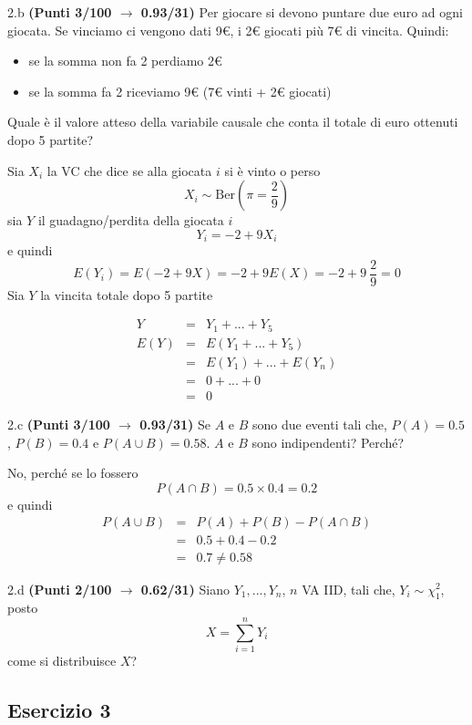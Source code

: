 \documentclass[
  11pt,
]{book}
\providecommand{\tightlist}{%
  \setlength{\itemsep}{0pt}\setlength{\parskip}{0pt}}
\theoremstyle{mytheoremstyle}
\theoremstyle{mydefstyle}
\newenvironment{sol}
  {
  \begin{tcolorbox}[enhanced,breakable,arc=0.1mm,boxrule=1pt,colback=white,colframe=iblue,
  title=\bf \fontfamily{lmss}\selectfont \hspace{.5 cm} Soluzione,drop fuzzy shadow]

}{
\end{tcolorbox}
  }
\begin{document}
2.b \textbf{(Punti 3/100 \(\rightarrow\) 0.93/31)} Per giocare si devono puntare due euro ad ogni giocata. Se vinciamo ci vengono dati 9€, i 2€ giocati più 7€ di vincita. Quindi:

\begin{itemize}
\tightlist
\item
  se la somma non fa 2 perdiamo 2€
\item
  se la somma fa 2 riceviamo 9€ (7€ vinti + 2€ giocati)
\end{itemize}

Quale è il valore atteso della variabile causale che conta il totale di euro ottenuti dopo 5 partite?

\begin{sol}
Sia \(X_i\) la VC che dice se alla giocata \(i\) si è vinto o perso
\[
X_i\sim\text{Ber}\left(\pi=\frac 29\right)
\]
sia \(Y\) il guadagno/perdita della giocata \(i\)
\[
Y_i=-2+9X_i
\]
e quindi
\[
E(Y_i)=E(-2+9X)=-2+9E(X)=-2+9~\frac29=0
\]
Sia \(Y\) la vincita totale dopo 5 partite

\begin{eqnarray*}
  Y  &=&Y_1+...+Y_5\\
E(Y) &=&E(Y_1+...+Y_5)\\
     &=&E(Y_1)+...+E(Y_n)\\
     &=& 0+...+0\\
     &=& 0
\end{eqnarray*}

\end{sol}

2.c \textbf{(Punti 3/100 \(\rightarrow\) 0.93/31)} Se \(A\) e \(B\) sono due eventi tali che, \(P(A)=0.5\), \(P(B)=0.4\) e \(P(A\cup B)=0.58\). \(A\) e \(B\) sono indipendenti? Perché?

\begin{sol}
No, perché se lo fossero
\[
P(A\cap B)=0.5\times 0.4=0.2
\]
e quindi
\begin{eqnarray*}
  P(A\cup B) &=& P(A)+P(B)-P(A\cap B)\\
             &=& 0.5+0.4-0.2\\
             &=& 0.7\ne 0.58
\end{eqnarray*}

\end{sol}

2.d \textbf{(Punti 2/100 \(\rightarrow\) 0.62/31)} Siano \(Y_1,...,Y_n\), \(n\) VA IID, tali che, \(Y_i\sim\chi_{1}^2\), posto
\[
X=\sum_{i=1}^n Y_i
\]
come si distribuisce \(X\)?

\subsection{Esercizio 3}\label{esercizio-3-7}
\end{document}
